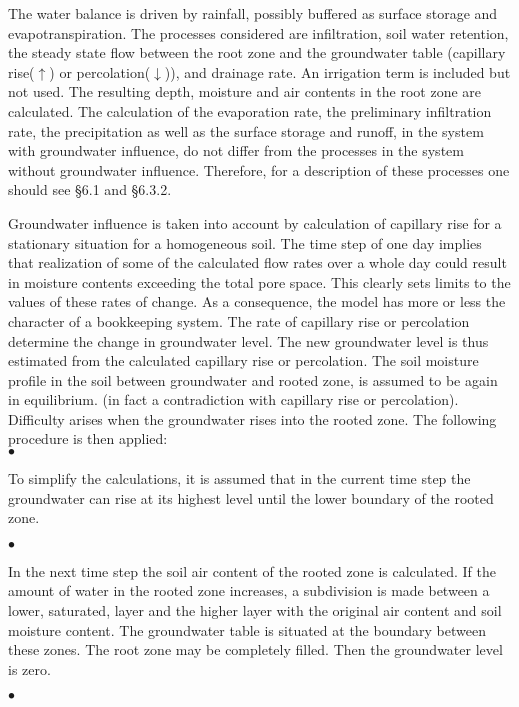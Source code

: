 The water balance is driven by rainfall, possibly buffered as surface storage and
{\nobreak}evapotranspiration. The processes considered are infiltration, soil water retention, the
steady state flow between the root zone and the groundwater table (capillary rise($\uparrow$) or
percolation($\downarrow$)), and drainage rate. An irrigation term is included but not used. The
resulting depth, moisture and air contents in the root zone are calculated. The calculation
of the evaporation rate, the preliminary infiltration rate, the precipitation as well as the
surface storage and runoff, in the system with groundwater influence, do not differ from
the processes in the system without groundwater influence. Therefore, for a description of
these processes one should see \S 6.1 and \S 6.3.2.

Groundwater influence is taken into account by calculation of capillary rise for a
stationary situation for a homogeneous soil. The time step of one day implies that
realization of some of the calculated flow rates over a whole day could result in moisture
contents exceeding the total pore space. This clearly sets limits to the values of these rates
of change. As a consequence, the model has more or less the character of a bookkeeping
system. The rate of capillary rise or percolation determine the change in groundwater
level. The new groundwater level is thus estimated from the calculated capillary rise or
percolation. The soil moisture profile in the soil between groundwater and rooted zone, is
assumed to be again in equilibrium. (in fact a contradiction with capillary rise or
percolation). \\
Difficulty arises when the groundwater rises into the rooted zone. The following proce\-dure is then applied:\\
$\bullet$
\testlastline

\begin{indenting}{1.27cm}
To simplify the calculations, it is assumed that in the current time step the
groundwater can rise at its highest level until the lower boundary of the rooted
zone.
\end{indenting}
$\bullet$
\testlastline

\begin{indenting}{1.27cm}
In the next time step the soil air content of the rooted zone is calculated. If the
amount of water in the rooted zone increases, a subdivision is made between a
lower, saturated, layer and the higher layer with the original air content and soil
moisture content. The {\nobreak}groundwater table is situated at the boundary between these
zones. The root zone may be completely filled. Then the groundwater level is
zero.
\end{indenting}
$\bullet$ 
\testlastline


